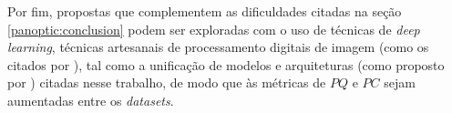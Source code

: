 Por fim, propostas que complementem as dificuldades citadas na seção \ref{panoptic:conclusion} podem ser exploradas com o uso de técnicas de \textit{deep learning}, técnicas artesanais de processamento digitais de imagem (como os citados por \cite{pedrini2008analise}), tal como a unificação de modelos e arquiteturas (como proposto por \cite{Liu2019}) citadas nesse trabalho, de modo que às métricas de $PQ$ e $PC$ sejam aumentadas entre os \textit{datasets}.